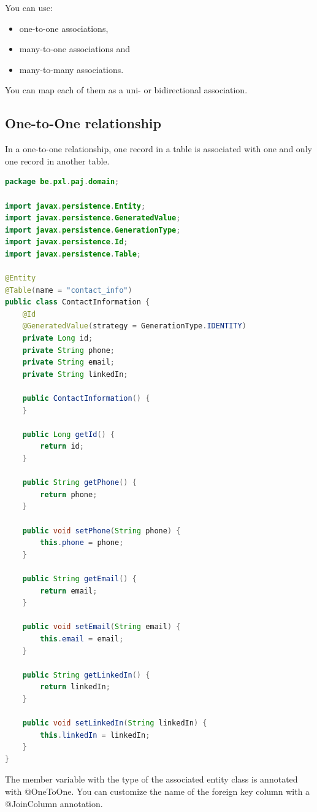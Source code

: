  You can use:
\begin{itemize}
\item one-to-one associations,
\item many-to-one associations and
\item many-to-many associations.
\end{itemize}
You can map each of them as a uni- or bidirectional association.


\subsection{One-to-One relationship}

In a one-to-one relationship, one record in a table is associated with one and only one record in another table.

\begin{lstlisting}[frame=single, language=java]
package be.pxl.paj.domain;

import javax.persistence.Entity;
import javax.persistence.GeneratedValue;
import javax.persistence.GenerationType;
import javax.persistence.Id;
import javax.persistence.Table;

@Entity
@Table(name = "contact_info")
public class ContactInformation {
	@Id
	@GeneratedValue(strategy = GenerationType.IDENTITY)
	private Long id;
	private String phone;
	private String email;
	private String linkedIn;

	public ContactInformation() {
	}

	public Long getId() {
		return id;
	}

	public String getPhone() {
		return phone;
	}

	public void setPhone(String phone) {
		this.phone = phone;
	}

	public String getEmail() {
		return email;
	}

	public void setEmail(String email) {
		this.email = email;
	}

	public String getLinkedIn() {
		return linkedIn;
	}

	public void setLinkedIn(String linkedIn) {
		this.linkedIn = linkedIn;
	}
}
\end{lstlisting}

The member variable with the type of the associated entity class is annotated with @OneToOne. You can customize the name of the foreign key column with a @JoinColumn annotation.

